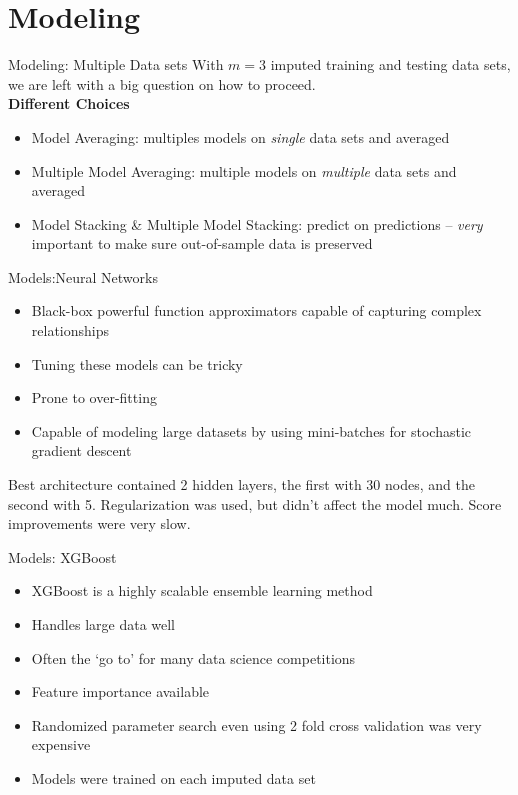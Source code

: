 \documentclass{beamer}
\begin{document}
\section{Modeling}
\begin{frame}{Modeling: Multiple Data sets}
With $m = 3$ imputed training and testing data sets, we are left with a big question on how to proceed.\\
\textbf{Different Choices}
\begin{itemize}
	\item Model Averaging: multiples models on \textit{single} data sets and averaged
	\item Multiple Model Averaging: multiple models on \textit{multiple} data sets and averaged
	\item Model Stacking \& Multiple Model Stacking: predict on predictions -- \textit{very} important to make sure out-of-sample data is preserved
\end{itemize}
\end{frame}

\begin{frame}{Models:Neural Networks}
\begin{itemize}
	\item Black-box powerful function approximators capable of capturing complex relationships
	\item Tuning these models can be tricky
	\item Prone to over-fitting
	\item Capable of modeling large datasets by using mini-batches for stochastic gradient descent
\end{itemize}
Best architecture contained 2 hidden layers, the first with 30 nodes, and the second with 5. Regularization was used, but didn't affect the model much. Score improvements were very slow.
\end{frame}
	

\begin{frame}{Models: XGBoost}
\begin{itemize}
	\item XGBoost is a highly scalable ensemble learning method
	\item Handles large data well
	\item Often the `go to' for many data science competitions
	\item Feature importance available
	\item Randomized parameter search even using 2 fold cross validation was very expensive
	\item Models were trained on each imputed data set
\end{itemize}

\end{frame}
\end{document}
